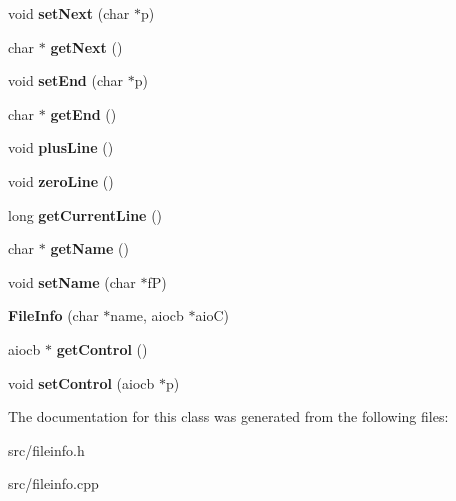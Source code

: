 \begin{DoxyCompactItemize}
\item 
\hypertarget{class_file_info_a24b4a630bb0cc04a05681c35acd2c016}{void {\bfseries set\-Next} (char $\ast$p)}\label{class_file_info_a24b4a630bb0cc04a05681c35acd2c016}

\item 
\hypertarget{class_file_info_ab72552cb448305388498fde6ecb9d892}{char $\ast$ {\bfseries get\-Next} ()}\label{class_file_info_ab72552cb448305388498fde6ecb9d892}

\item 
\hypertarget{class_file_info_aab4240944593dc50de63c23fa2f2342e}{void {\bfseries set\-End} (char $\ast$p)}\label{class_file_info_aab4240944593dc50de63c23fa2f2342e}

\item 
\hypertarget{class_file_info_a3ad721b81995164f09ec1e1a32f92b89}{char $\ast$ {\bfseries get\-End} ()}\label{class_file_info_a3ad721b81995164f09ec1e1a32f92b89}

\item 
\hypertarget{class_file_info_a35e4814edf97a5274e0a90bcfebab1e1}{void {\bfseries plus\-Line} ()}\label{class_file_info_a35e4814edf97a5274e0a90bcfebab1e1}

\item 
\hypertarget{class_file_info_ac6ca7d0f6f3b7a56fef6d8c76809ed14}{void {\bfseries zero\-Line} ()}\label{class_file_info_ac6ca7d0f6f3b7a56fef6d8c76809ed14}

\item 
\hypertarget{class_file_info_a846ad22537db90b19697be30ff98a1ca}{long {\bfseries get\-Current\-Line} ()}\label{class_file_info_a846ad22537db90b19697be30ff98a1ca}

\item 
\hypertarget{class_file_info_adea627d56f36a194316ceea45640ecba}{char $\ast$ {\bfseries get\-Name} ()}\label{class_file_info_adea627d56f36a194316ceea45640ecba}

\item 
\hypertarget{class_file_info_aa43c7dbaf488d356faf245d1272e75b6}{void {\bfseries set\-Name} (char $\ast$f\-P)}\label{class_file_info_aa43c7dbaf488d356faf245d1272e75b6}

\item 
\hypertarget{class_file_info_a53baf66c86c48cb76dad7c37cf7c5688}{{\bfseries File\-Info} (char $\ast$name, aiocb $\ast$aio\-C)}\label{class_file_info_a53baf66c86c48cb76dad7c37cf7c5688}

\item 
\hypertarget{class_file_info_ad68fb191e48f1f4679b5b5265eb12e37}{aiocb $\ast$ {\bfseries get\-Control} ()}\label{class_file_info_ad68fb191e48f1f4679b5b5265eb12e37}

\item 
\hypertarget{class_file_info_affae86ac942e4a08aabf7570a892ac90}{void {\bfseries set\-Control} (aiocb $\ast$p)}\label{class_file_info_affae86ac942e4a08aabf7570a892ac90}

\end{DoxyCompactItemize}


The documentation for this class was generated from the following files\-:\begin{DoxyCompactItemize}
\item 
src/fileinfo.\-h\item 
src/fileinfo.\-cpp\end{DoxyCompactItemize}

